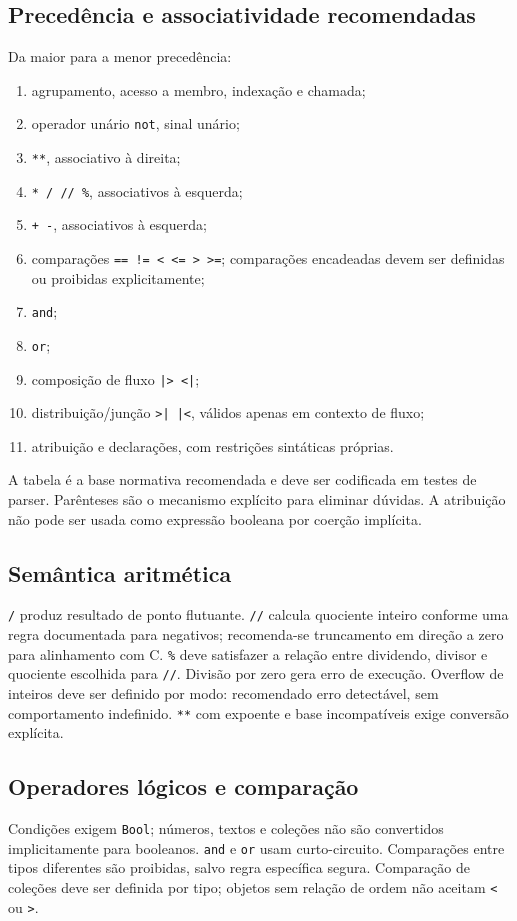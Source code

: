 \documentclass[12pt,a4paper]{article}
\begin{document}
\subsection{Precedência e associatividade recomendadas}
Da maior para a menor precedência:
\begin{enumerate}
\item agrupamento, acesso a membro, indexação e chamada;
\item operador unário \texttt{not}, sinal unário;
\item \texttt{**}, associativo à direita;
\item \texttt{* / // \%}, associativos à esquerda;
\item \texttt{+ -}, associativos à esquerda;
\item comparações \texttt{== != < <= > >=}; comparações encadeadas devem ser definidas ou proibidas explicitamente;
\item \texttt{and};
\item \texttt{or};
\item composição de fluxo \texttt{|> <|};
\item distribuição/junção \texttt{>| |<}, válidos apenas em contexto de fluxo;
\item atribuição e declarações, com restrições sintáticas próprias.
\end{enumerate}
A tabela é a base normativa recomendada e deve ser codificada em testes de parser. Parênteses são o mecanismo explícito para eliminar dúvidas. A atribuição não pode ser usada como expressão booleana por coerção implícita.
\subsection{Semântica aritmética}
\texttt{/} produz resultado de ponto flutuante. \texttt{//} calcula quociente inteiro conforme uma regra documentada para negativos; recomenda-se truncamento em direção a zero para alinhamento com C. \texttt{\%} deve satisfazer a relação entre dividendo, divisor e quociente escolhida para \texttt{//}. Divisão por zero gera erro de execução. Overflow de inteiros deve ser definido por modo: recomendado erro detectável, sem comportamento indefinido. \texttt{**} com expoente e base incompatíveis exige conversão explícita.
\subsection{Operadores lógicos e comparação}
Condições exigem \texttt{Bool}; números, textos e coleções não são convertidos implicitamente para booleanos. \texttt{and} e \texttt{or} usam curto-circuito. Comparações entre tipos diferentes são proibidas, salvo regra específica segura. Comparação de coleções deve ser definida por tipo; objetos sem relação de ordem não aceitam \texttt{<} ou \texttt{>}.
\end{document}
